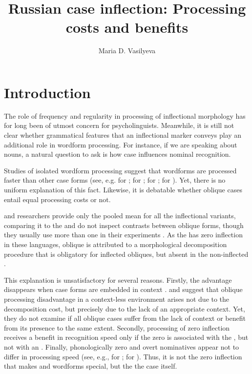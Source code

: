 \documentclass[output=paper, modfonts,newtxmath,hidelinks]{langscibook}
\title{Russian case inflection: Processing costs and benefits}
\author{Maria D. Vasilyeva \affiliation{Lomonosov Moscow State University}
}
\begin{document}
\maketitle
{}

\section{\label{sec:intro}Introduction}
The role of frequency and regularity in processing of inflectional morphology has for long been of utmost concern for psycholinguists. Meanwhile, it is still not clear whether grammatical features that an inflectional marker conveys play an additional role in wordform processing. For instance, if we are speaking about nouns, a natural question to ask is how case influences nominal recognition.

Studies of isolated wordform processing suggest that  wordforms are processed faster than other case forms (see, e.g. \citealt{lukatela1978lexical}  for ; \citealt{niemi1994cognitive} for ; \citealt{abulizi2016cognitive} for ; \citealt{gor2017processing} for ). Yet, there is no uniform explanation of this fact. Likewise, it is debatable whether oblique cases entail equal processing costs or not.

 and  researchers provide only  the pooled mean for all the inflectional variants, comparing it to the  and do not inspect contrasts between oblique forms, though they usually use more than one  in their experiments \citep{niemi1991recognition, niemi1994cognitive, hyovcnavc1995effects, laine1998lexical, laine1999lexical, abulizi2016cognitive}. As the  has zero inflection in these languages, oblique  is attributed to a morphological decomposition procedure that is obligatory for inflected obliques, but absent in the non-inflected .

This explanation is unsatisfactory for several reasons. Firstly, the  advantage disappears when  case forms are embedded in context  \citep{bertram2000role, hyona2002morphological}. \citet{bertram2000role} and \citet{hyona2002morphological} suggest that oblique processing disadvantage in a context-less environment arises not due to the decomposition cost, but precisely due to the lack of an appropriate context. Yet, they do not examine if all oblique cases suffer from the lack of context or benefit from its presence to the same extent. Secondly, processing of zero inflection receives a benefit in recognition speed only if the zero is associated with the , but not with an  \citep{gor2017processing}.  Finally, phonologically zero and overt nominatives appear not to differ in processing speed (see, e.g., \citealt{lukatelaEtAl1980} for ; \citealt{gor2017processing} for ). Thus, it is not the zero inflection that makes  and   wordforms special, but the the  case itself.
\end{document}
